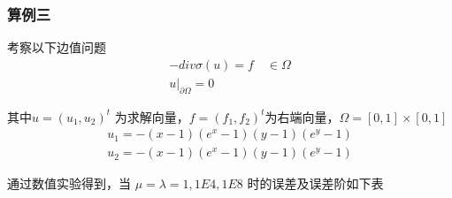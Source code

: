 \documentclass[a4paper,UTF8,titlepage]{ctexart}
\begin{document}
\begin{figure}[ht]
	\centering
	\caption{}
\end{figure}

\newpage

\subsubsection{算例三}

考察以下边值问题
$$
\begin{matrix}
	-div \sigma(u) = f \quad \in \Omega  \\
	u |_{\partial \Omega} = 0
\end{matrix}
$$ 
\par
其中$ u = (u_1,u_2)^t $ 为求解向量，$ f = (f_1,f_2)^t $为右端向量，$ \Omega = [0,1] \times [0,1] $
$$
\begin{matrix}
	u_1 = -(x-1) (e^x-1) (y-1) (e^y-1)
	\\
	u_2 = -(x-1) (e^x-1) (y-1) (e^y-1) 
\end{matrix}
$$

通过数值实验得到，当 $\mu = \lambda = 1, 1E4, 1E8$ 时的误差及误差阶如下表
\end{document}
